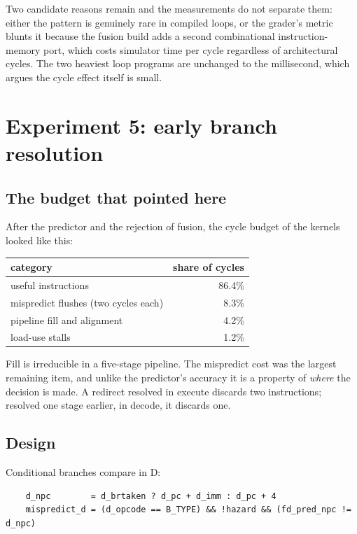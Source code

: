 \documentclass[11pt]{article}
\begin{document}
Two candidate reasons remain and the measurements do not separate them: either the pattern is
genuinely rare in compiled loops, or the grader's metric blunts it because the fusion build adds
a second combinational instruction-memory port, which costs simulator time per cycle regardless
of architectural cycles. The two heaviest loop programs are unchanged to the millisecond, which
argues the cycle effect itself is small.

\section{Experiment 5: early branch resolution}

\subsection{The budget that pointed here}

After the predictor and the rejection of fusion, the cycle budget of the kernels looked like
this:

\begin{center}
\begin{tabular}{lr}
\toprule
category & share of cycles \\
\midrule
useful instructions & 86.4\% \\
mispredict flushes (two cycles each) & 8.3\% \\
pipeline fill and alignment & 4.2\% \\
load-use stalls & 1.2\% \\
\bottomrule
\end{tabular}
\end{center}

Fill is irreducible in a five-stage pipeline. The mispredict cost was the largest remaining
item, and unlike the predictor's accuracy it is a property of \emph{where} the decision is made.
A redirect resolved in execute discards two instructions; resolved one stage earlier, in decode,
it discards one.

\subsection{Design}

Conditional branches compare in D:

\begin{verbatim}
    d_npc        = d_brtaken ? d_pc + d_imm : d_pc + 4
    mispredict_d = (d_opcode == B_TYPE) && !hazard && (fd_pred_npc != d_npc)
\end{verbatim}
\end{document}
